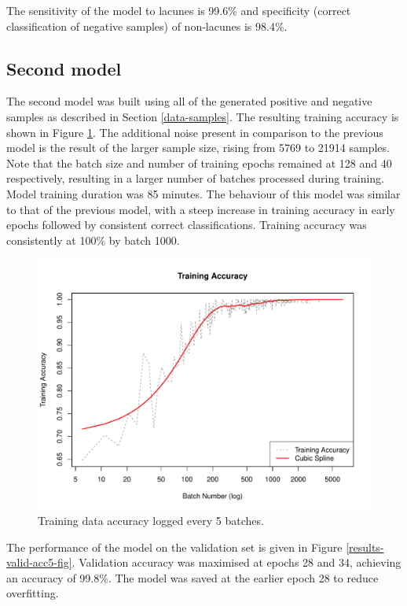 The sensitivity of the model to lacunes is 99.6\% and specificity (correct classification of negative samples) of non-lacunes is 98.4\%.

\subsection*{Second model}

The second model was built using all of the generated positive and negative samples as described in Section \ref{data-samples}. The resulting training accuracy is shown in Figure \ref{results-train-acc5-fig}. The additional noise present in comparison to the previous model is the result of the larger sample size, rising from 5769 to 21914 samples. Note that the batch size and number of training epochs remained at 128 and 40 respectively, resulting in a larger number of batches processed during training. Model training duration was 85 minutes. The behaviour of this model was similar to that of the previous model, with a steep increase in training accuracy in early epochs followed by consistent correct classifications. Training accuracy was consistently at 100\% by batch 1000. 

\begin{figure}[ht]
	\centering
	\includegraphics[width=\textwidth]{Images/7_train_acc5.pdf}
	\caption{Training data accuracy logged every 5 batches.}
	\label{results-train-acc5-fig}
\end{figure}

The performance of the model on the validation set is given in Figure \ref{results-valid-acc5-fig}. Validation accuracy was maximised at epochs 28 and 34, achieving an accuracy of 99.8\%. The model was saved at the earlier epoch 28 to reduce overfitting.

